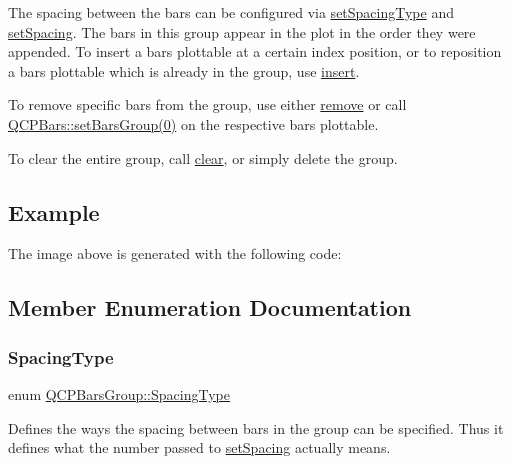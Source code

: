 The spacing between the bars can be configured via \mbox{\hyperlink{class_q_c_p_bars_group_a2c7e2d61b10594a4555b615e1fcaf49e}{set\+Spacing\+Type}} and \mbox{\hyperlink{class_q_c_p_bars_group_aa553d327479d72a0c3dafcc724a190e2}{set\+Spacing}}. The bars in this group appear in the plot in the order they were appended. To insert a bars plottable at a certain index position, or to reposition a bars plottable which is already in the group, use \mbox{\hyperlink{class_q_c_p_bars_group_a309a5f7233db189f3ea9c2d04ece6c13}{insert}}.

To remove specific bars from the group, use either \mbox{\hyperlink{class_q_c_p_bars_group_a215e28a5944f1159013a0e19169220e7}{remove}} or call \mbox{\hyperlink{class_q_c_p_bars_aedd1709061f0b307c47ddb45e172ef9a}{Q\+C\+P\+Bars\+::set\+Bars\+Group(0)}} on the respective bars plottable.

To clear the entire group, call \mbox{\hyperlink{class_q_c_p_bars_group_a3ddf23928c6cd89530bd34ab7ba7b177}{clear}}, or simply delete the group.\hypertarget{class_q_c_p_bars_group_qcpbarsgroup-example}{}\subsection{Example}\label{class_q_c_p_bars_group_qcpbarsgroup-example}
The image above is generated with the following code\+: 
\begin{DoxyCodeInclude}{0}
\end{DoxyCodeInclude}


\subsection{Member Enumeration Documentation}
\mbox{\label{class_q_c_p_bars_group_a4c0521120a97e60bbca37677a37075b6}} 
\subsubsection{\texorpdfstring{SpacingType}{SpacingType}}
{\footnotesize\ttfamily enum \mbox{\hyperlink{class_q_c_p_bars_group_a4c0521120a97e60bbca37677a37075b6}{Q\+C\+P\+Bars\+Group\+::\+Spacing\+Type}}}

Defines the ways the spacing between bars in the group can be specified. Thus it defines what the number passed to \mbox{\hyperlink{class_q_c_p_bars_group_aa553d327479d72a0c3dafcc724a190e2}{set\+Spacing}} actually means.

